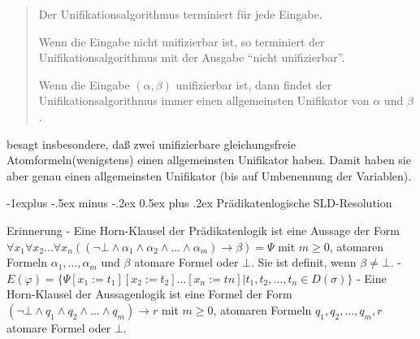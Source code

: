 \documentclass[a4paper]{article}
\makeatletter
\renewcommand{\subsection}{\@startsection{subsection}{2}{0mm}%
                {-1explus -.5ex minus -.2ex}%
                {0.5ex plus .2ex}%
                {\normalfont\normalsize\bfseries}}
\makeatother
\begin{document}
\begin{multicols}{3}
\begin{quote}
    \begin{itemize*}
      \item
            \begin{enumerate*}
              \def\labelenumi{(\Alph{enumi})}
              \item
                    Der Unifikationsalgorithmus terminiert für jede Eingabe.
            \end{enumerate*}
      \item
            \begin{enumerate*}
              \def\labelenumi{(\Alph{enumi})}
              \setcounter{enumi}{1}
              \item
                    Wenn die Eingabe nicht unifizierbar ist, so terminiert der
                    Unifikationsalgorithmus mit der Ausgabe ``nicht unifizierbar''.
            \end{enumerate*}
      \item
            \begin{enumerate*}
              \def\labelenumi{(\Alph{enumi})}
              \setcounter{enumi}{2}
              \item
                    Wenn die Eingabe $(\alpha,\beta)$ unifizierbar ist, dann findet der
                    Unifikationsalgorithmus immer einen allgemeinsten Unifikator von
                    $\alpha$ und $\beta$.
            \end{enumerate*}
    \end{itemize*}
  \end{quote}

  \begin{enumerate*}
    \def\labelenumi{(\Alph{enumi})}
    \setcounter{enumi}{2}
    \itemsep1pt\parskip0pt
    \item
          besagt insbesondere, daß zwei unifizierbare gleichungsfreie
          Atomformeln(wenigstens) einen allgemeinsten Unifikator haben. Damit
          haben sie aber genau einen allgemeinsten Unifikator (bis auf
          Umbenennung der Variablen).
  \end{enumerate*}

  \subsection{Prädikatenlogische
    SLD-Resolution}\label{pruxe4dikatenlogische-sld-resolution}

  Erinnerung - Eine Horn-Klausel der Prädikatenlogik ist eine Aussage der
  Form
  $\forall x_1 \forall x_2... \forall x_n ((\lnot\bot \wedge\alpha_1 \wedge\alpha_2 \wedge...\wedge\alpha_m)\rightarrow\beta)=\Psi$
  mit $m\geq 0$, atomaren Formeln $\alpha_1,...,\alpha_m$ und $\beta$
  atomare Formel oder $\bot$. Sie ist definit, wenn $\beta\not =\bot$. -
  $E(\varphi) =\{\Psi[x_1 :=t_1 ][x_2 :=t_2 ]...[x_n:=tn]|t_1 ,t_2 ,...,t_n\in D(\sigma)\}$
  - Eine Horn-Klausel der Aussagenlogik ist eine Formel der Form
  $(\lnot\bot\wedge q_1 \wedge q_2 \wedge... \wedge q_m)\rightarrow r$ mit
  $m\geq 0$, atomaren Formeln $q_1,q_2,...,q_m,r$ atomare Formel oder
  $\bot$.


\end{multicols}
\end{document}
